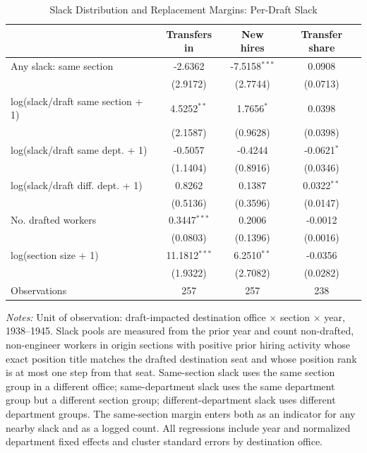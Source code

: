\begin{table}[htbp]
\centering
\caption{Slack Distribution and Replacement Margins: Per-Draft Slack}
\small
\begin{threeparttable}
\begin{tabular}{lccc}
\toprule
 & Transfers in & New hires & Transfer share \\
\midrule
Any slack: same section & -2.6362 & -7.5158$^{***}$ & 0.0908 \\
  & (2.9172) & (2.7744) & (0.0713) \\[3pt]
log(slack/draft same section + 1) & 4.5252$^{**}$ & 1.7656$^{*}$ & 0.0398 \\
  & (2.1587) & (0.9628) & (0.0398) \\[3pt]
log(slack/draft same dept. + 1) & -0.5057 & -0.4244 & -0.0621$^{*}$ \\
  & (1.1404) & (0.8916) & (0.0346) \\[3pt]
log(slack/draft diff. dept. + 1) & 0.8262 & 0.1387 & 0.0322$^{**}$ \\
  & (0.5136) & (0.3596) & (0.0147) \\[3pt]
No. drafted workers & 0.3447$^{***}$ & 0.2006 & -0.0012 \\
  & (0.0803) & (0.1396) & (0.0016) \\[3pt]
log(section size + 1) & 11.1812$^{***}$ & 6.2510$^{**}$ & -0.0356 \\
  & (1.9322) & (2.7082) & (0.0282) \\[3pt]
\midrule
Observations & 257 & 257 & 238 \\
\bottomrule
\end{tabular}
\begin{tablenotes}[flushleft]\footnotesize
\item \textit{Notes:} Unit of observation: draft-impacted destination office $\times$ section $\times$ year, 1938--1945. Slack pools are measured from the prior year and count non-drafted, non-engineer workers in origin sections with positive prior hiring activity whose exact position title matches the drafted destination seat and whose position rank is at most one step from that seat. Same-section slack uses the same section group in a different office; same-department slack uses the same department group but a different section group; different-department slack uses different department groups. The same-section margin enters both as an indicator for any nearby slack and as a logged count. All regressions include year and normalized department fixed effects and cluster standard errors by destination office.
\end{tablenotes}
\end{threeparttable}
\end{table}
